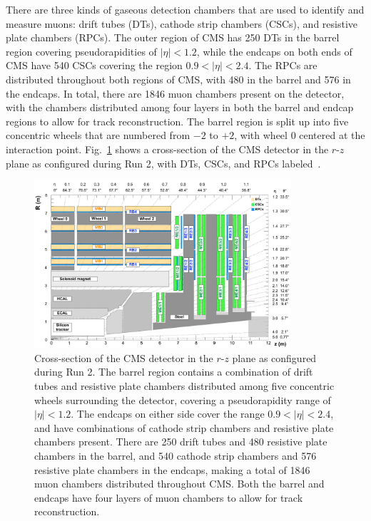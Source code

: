 There are three kinds of gaseous detection chambers that are used to identify and measure muons: drift tubes (DTs), cathode strip chambers (CSCs), and resistive plate chambers (RPCs).
The outer region of CMS has 250 DTs in the barrel region covering pseudorapidities of $|\eta|<1.2$, while the endcaps on both ends of CMS have 540 CSCs covering the region $0.9<|\eta|<2.4$.
The RPCs are distributed throughout both regions of CMS, with 480 in the barrel and 576 in the endcaps.
In total, there are 1846 muon chambers present on the detector, with the chambers distributed among four layers in both the barrel and endcap regions to allow for track reconstruction. %
The barrel region is split up into five concentric wheels that are numbered from $-2$ to $+2$, with wheel 0 centered at the interaction point.
Fig.~\ref{fig:CMScrosssec} shows a cross-section of the CMS detector in the $r$-$z$ plane as configured during Run 2, with DTs, CSCs, and RPCs labeled~\cite{Sirunyan_2018_CMS}.

\begin{figure}[htbp]
  \centering
  \includegraphics[width=0.85\textwidth]{fig/experiment/cms_crosssec.pdf}
  \caption{
    Cross-section of the CMS detector in the $r$-$z$ plane as configured during Run 2.
    The barrel region contains a combination of drift tubes and resistive plate chambers distributed among five concentric wheels surrounding the detector, covering a pseudorapidity range of $|\eta|<1.2$.
    The endcaps on either side cover the range $0.9<|\eta|<2.4$, and have combinations of cathode strip chambers and resistive plate chambers present.
    There are 250 drift tubes and 480 resistive plate chambers in the barrel, and 540 cathode strip chambers and 576 resistive plate chambers in the endcaps, making a total of 1846 muon chambers distributed throughout CMS.
    Both the barrel and endcaps have four layers of muon chambers to allow for track reconstruction.
  }
  \label{fig:CMScrosssec}
\end{figure}

